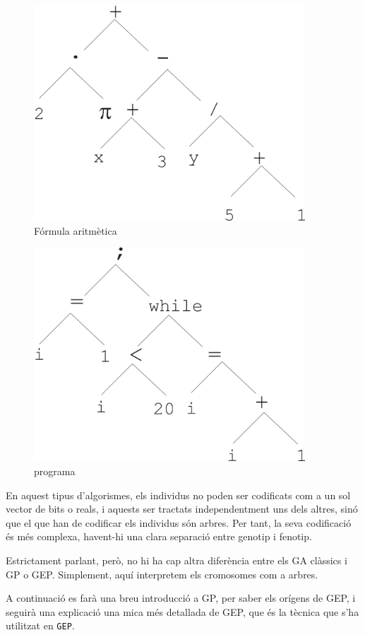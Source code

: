 \begin{figure} \centering \includegraphics[width=4in]{intro/6-2-1.jpg}
\caption{\label{fig:6-2-1}Fórmula aritmètica}
\end{figure}

\begin{figure} \centering \includegraphics[width=4in]{intro/6-3.jpg}
\caption{\label{fig:6-3}programa}
\end{figure}

En aquest tipus d'algorismes, els individus no poden ser codificats com a un
sol vector de bits o reals, i aquests ser tractats independentment uns dels
altres, sinó que el que han de codificar els individus són arbres.  Per tant,
la seva codificació és més complexa, havent-hi una clara separació entre genotip
i fenotip.

Estrictament parlant, però, no hi ha cap altra diferència entre els GA clàssics
i GP o GEP.  Simplement, aquí interpretem els cromosomes com a arbres.

A continuació es farà una breu introducció a GP, per saber els orígens de
GEP, i seguirà una explicació una mica més detallada de GEP, que és la tècnica
que s'ha utilitzat en \texttt{GEP}.

